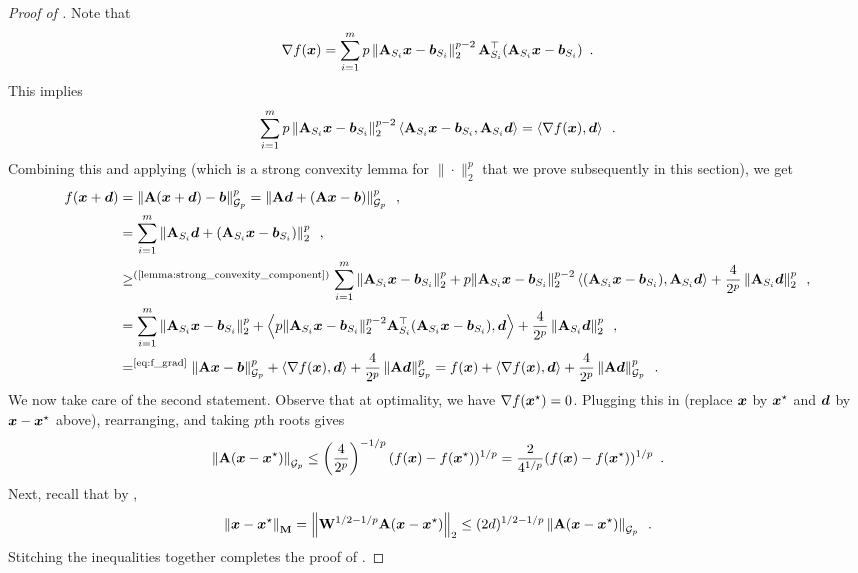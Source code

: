 \begin{proof}[Proof of ]
Note that
\begin{align*}
    \nabla f(\bm{x}) = \sum_{i=1}^m p\left\lVert \mathbf{A}_{S_i}\bm{x}-\bm{b}_{S_i} \right\rVert_2^{p-2}\mathbf{A}_{S_i}^{\top}(\mathbf{A}_{S_i}\bm{x}-\bm{b}_{S_i})\enspace.
\end{align*}
This implies
\begin{align*}
    \sum_{i=1}^m p\left\lVert \mathbf{A}_{S_i}\bm{x}-\bm{b}_{S_i} \right\rVert_2^{p-2}\left\langle \mathbf{A}_{S_i}\bm{x}-\bm{b}_{S_i},\mathbf{A}_{S_i}\bm{d} \right\rangle = \left\langle \nabla f(\bm{x}),\bm{d} \right\rangle\enspace.
\end{align*}
Combining this and applying  (which is a strong convexity lemma for $\|\cdot\|_2^p$ that we prove subsequently in this section), we get
\begin{align*}
    f(\vx+\vd) &= \gnorm{\mA(\vx+\vd)-\vb}{p}^p = \gnorm{\mA\vd+(\mA\vx-\vb)}{p}^p\enspace,\\
    &= \sum_{i=1}^m \norm{\mA_{S_i}\vd+(\mA_{S_i}\vx-\vb_{S_i})}_2^p\enspace,\\
    &\ge^{\text{(\Cref{lemma:strong_convexity_component})}} \sum_{i=1}^m \norm{\mA_{S_i}\vx-\vb_{S_i}}_2^p + p\|\mA_{S_i}\vx-\vb_{S_i}\|_2^{p-2}\ip{(\mA_{S_i}\vx-\vb_{S_i}),\mA_{S_i}\vd}+ \frac{4}{2^p}\norm{\mA_{S_i}\vd}_2^p\enspace,\\
    &= \sum_{i=1}^m \norm{\mA_{S_i}\vx-\vb_{S_i}}_2^p + \ip{p\|\mA_{S_i}\vx-\vb_{S_i}\|_2^{p-2}\mA_{S_i}^{\top}(\mA_{S_i}\vx-\vb_{S_i}),\vd}+ \frac{4}{2^p}\norm{\mA_{S_i}\vd}_2^p\enspace,\\
    &=^{\text{\eqref{eq:f_grad}}} \gnorm{\mA\vx-\vb}{p}^p + \ip{\nabla f(\vx),\vd} + \frac{4}{2^p}\gnorm{\mA\vd}{p}^p = f(\vx) + \ip{\nabla f(\vx),\vd} + \frac{4}{2^p}\gnorm{\mA\vd}{p}^p\enspace.
\end{align*}
We now take care of the second statement. Observe that at optimality, we have $\nabla f(\bm{x}^{\star}) = 0$. Plugging this in (replace $\bm{x}$ by $\bm{x}^\star$ and $\bm{d}$ by $\bm{x}-\bm{x}^\star$ above), rearranging, and taking $p$th roots gives
\begin{align*}
    \left\lVert \mathbf{A}(\bm{x}-\bm{x}^{\star}) \right\rVert_{\mathcal{G}_{p}} \le \left(\frac{4}{2^p}\right)^{-1/p}(f(\bm{x})-f(\bm{x}^{\star}))^{1/p} = \frac{2}{4^{1/p}}(f(\bm{x})-f(\bm{x}^{\star}))^{1/p}\enspace. 
\end{align*}
Next, recall that by ,
\begin{align*}
    \left\lVert \bm{x}-\bm{x}^{\star} \right\rVert_{\mathbf{M}} = \left\lVert \mathbf{W}^{1/2-1/p}\mathbf{A}(\bm{x}-\bm{x}^{\star}) \right\rVert_2 \le (2d)^{1/2-1/p}\left\lVert \mathbf{A}(\bm{x}-\bm{x}^{\star}) \right\rVert_{\mathcal{G}_{p}}\enspace.
\end{align*}
Stitching the inequalities together completes the proof of .
\end{proof}

